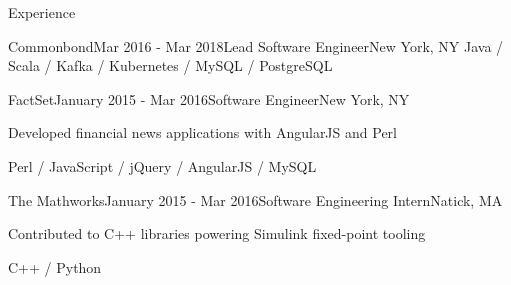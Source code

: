 \documentclass{resume} %
\begin{document}
\begin{rSection}{Experience}
\begin{rSubsection}{Commonbond}{Mar 2016 - Mar 2018}{Lead Software Engineer}{New York, NY}
Java / Scala / Kafka / Kubernetes / MySQL / PostgreSQL
\end{rSubsection}


\begin{rSubsection}{FactSet}{January 2015 - Mar 2016}{Software Engineer}{New York, NY}
\item Developed financial news applications with AngularJS and Perl

Perl / JavaScript / jQuery / AngularJS / MySQL
\end{rSubsection}


\begin{rSubsection}{The Mathworks}{January 2015 - Mar 2016}{Software Engineering Intern}{Natick, MA}
\item Contributed to C++ libraries powering Simulink fixed-point tooling

C++ / Python
\end{rSubsection}
\end{rSection}





\end{document}
